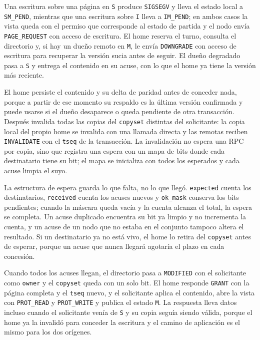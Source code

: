 Una escritura sobre una página en \texttt{S} produce \texttt{SIGSEGV} y lleva el estado local a \texttt{SM\_PEND}, mientras que una escritura sobre \texttt{I} lleva a \texttt{IM\_PEND}; en ambos casos la vista queda con el permiso que corresponde al estado de partida y el nodo envía \texttt{PAGE\_REQUEST} con acceso de escritura. El home reserva el turno, consulta el directorio y, si hay un dueño remoto en \texttt{M}, le envía \texttt{DOWNGRADE} con acceso de escritura para recuperar la versión sucia antes de seguir. El dueño degradado pasa a \texttt{S} y entrega el contenido en su acuse, con lo que el home ya tiene la versión más reciente.

El home persiste el contenido y su delta de paridad antes de conceder nada, porque a partir de ese momento su respaldo es la última versión confirmada y puede usarse si el dueño desaparece o queda pendiente de otra transacción. Después invalida todas las copias del \texttt{copyset} distintas del solicitante: la copia local del propio home se invalida con una llamada directa y las remotas reciben \texttt{INVALIDATE} con el \texttt{tseq} de la transacción. La invalidación no espera una RPC por copia, sino que registra una espera con un mapa de bits donde cada destinatario tiene su bit; el mapa se inicializa con todos los esperados y cada acuse limpia el suyo.

La estructura de espera guarda lo que falta, no lo que llegó. \texttt{expected} cuenta los destinatarios, \texttt{received} cuenta los acuses nuevos y \texttt{ok\_mask} conserva los bits pendientes; cuando la máscara queda vacía y la cuenta alcanza el total, la espera se completa. Un acuse duplicado encuentra su bit ya limpio y no incrementa la cuenta, y un acuse de un nodo que no estaba en el conjunto tampoco altera el resultado. Si un destinatario ya no está vivo, el home lo retira del \texttt{copyset} antes de esperar, porque un acuse que nunca llegará agotaría el plazo en cada concesión.

Cuando todos los acuses llegan, el directorio pasa a \texttt{MODIFIED} con el solicitante como \texttt{owner} y el \texttt{copyset} queda con un solo bit. El home responde \texttt{GRANT} con la página completa y el \texttt{tseq} nuevo, y el solicitante aplica el contenido, abre la vista con \texttt{PROT\_READ} y \texttt{PROT\_WRITE} y publica el estado \texttt{M}. La respuesta lleva datos incluso cuando el solicitante venía de \texttt{S} y su copia seguía siendo válida, porque el home ya la invalidó para conceder la escritura y el camino de aplicación es el mismo para los dos orígenes.

